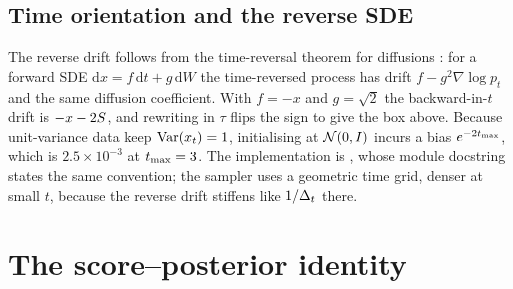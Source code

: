 \subsection{Time orientation and the reverse SDE}

\begin{center}
\end{center}

The reverse drift follows from the time-reversal theorem for diffusions
\citep{anderson1982reverse,haussmann1986}: for a forward SDE $\mathrm{d}x = f\,\mathrm{d}t +
g\,\mathrm{d}W$ the time-reversed process has drift $f - g^2\nabla\log p_t$ and the same
diffusion coefficient. With $f=-x$ and $g=\sqrt{2}$ the backward-in-$t$ drift is
$-x - 2S$, and rewriting in $\tau$ flips the sign to give the box above. Because unit-variance
data keep $\operatorname{Var}(x_t)=1$, initialising at $\mathcal{N}\!\left(0,I\right)$ incurs a bias $e^{-2t_{\max}}$, which is
$2.5\times10^{-3}$ at $t_{\max}=3$. The implementation is
, whose module docstring states the same convention; the sampler uses a
geometric time grid, denser at small $t$, because the reverse drift stiffens like
$1/\Delta_t$ there.

\section{The score--posterior identity}
\label{app:identity}


